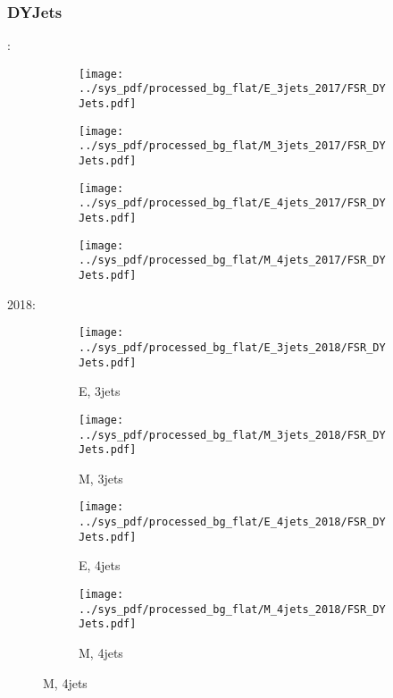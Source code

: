 \documentclass{beamer}
\begin{document}
\begin{frame}
\frametitle{DYJets}
\fontsize{5}{1}:
\begin{figure}
\centering
\begin{subfigure}[b]{0.24\textwidth}
\texttt{[image: ../sys\_pdf/processed\_bg\_flat/E\_3jets\_2017/FSR\_DYJets.pdf]}
\end{subfigure}
\begin{subfigure}[b]{0.24\textwidth}
\texttt{[image: ../sys\_pdf/processed\_bg\_flat/M\_3jets\_2017/FSR\_DYJets.pdf]}
\end{subfigure}
\begin{subfigure}[b]{0.24\textwidth}
\texttt{[image: ../sys\_pdf/processed\_bg\_flat/E\_4jets\_2017/FSR\_DYJets.pdf]}
\end{subfigure}
\begin{subfigure}[b]{0.24\textwidth}
\texttt{[image: ../sys\_pdf/processed\_bg\_flat/M\_4jets\_2017/FSR\_DYJets.pdf]}
\end{subfigure}
\end{figure}
2018:
\begin{figure}
\centering
\begin{subfigure}[b]{0.24\textwidth}
\texttt{[image: ../sys\_pdf/processed\_bg\_flat/E\_3jets\_2018/FSR\_DYJets.pdf]}
\captionsetup{font=tiny}
\caption{E, 3jets}
\end{subfigure}
\begin{subfigure}[b]{0.24\textwidth}
\texttt{[image: ../sys\_pdf/processed\_bg\_flat/M\_3jets\_2018/FSR\_DYJets.pdf]}
\captionsetup{font=tiny}
\caption{M, 3jets}
\end{subfigure}
\begin{subfigure}[b]{0.24\textwidth}
\texttt{[image: ../sys\_pdf/processed\_bg\_flat/E\_4jets\_2018/FSR\_DYJets.pdf]}
\captionsetup{font=tiny}
\caption{E, 4jets}
\end{subfigure}
\begin{subfigure}[b]{0.24\textwidth}
\texttt{[image: ../sys\_pdf/processed\_bg\_flat/M\_4jets\_2018/FSR\_DYJets.pdf]}
\captionsetup{font=tiny}
\caption{M, 4jets}
\end{subfigure}
\end{figure}
\end{frame}
\end{document}
